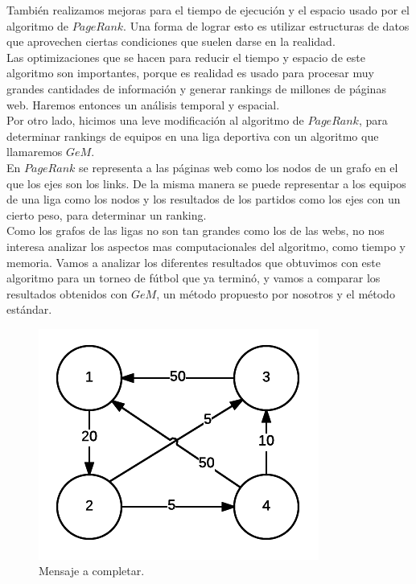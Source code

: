 También realizamos mejoras para el tiempo de ejecución y el espacio usado por el algoritmo de $PageRank$. Una forma de lograr esto es utilizar estructuras de datos que aprovechen ciertas condiciones que suelen darse en la realidad.\\

 Las optimizaciones que se hacen para reducir el tiempo y espacio de este algoritmo son importantes, porque es realidad es usado para procesar muy grandes cantidades de información y generar rankings de millones de páginas web. Haremos entonces un análisis temporal y espacial.\\

Por otro lado, hicimos una leve modificación al algoritmo de $PageRank$, para determinar rankings de equipos en una liga deportiva con un algoritmo que llamaremos $GeM$. \\

En $PageRank$ se representa a las páginas web como los nodos de un grafo en el que los ejes son los links. De la misma manera se puede representar a los equipos de una liga como los nodos y los resultados de los partidos como los ejes con un cierto peso, para determinar un ranking.\\

Como los grafos de las ligas no son tan grandes como los de las webs, no nos interesa analizar los aspectos mas computacionales del algoritmo, como tiempo y memoria. Vamos a analizar los diferentes resultados que obtuvimos con este algoritmo para un torneo de fútbol que ya terminó, y vamos a comparar los resultados obtenidos con $GeM$, un método propuesto por nosotros y el método estándar.\\


\begin{figure}
  \vspace{-20pt}
  \begin{center}
    \includegraphics[scale= 0.8]{imagenes/grafo4equipos.png}
  \end{center}
  \vspace{-20pt}
  \caption{Mensaje a completar.}
  \vspace{-10pt}
  \label{fig:img2}
\end{figure}


